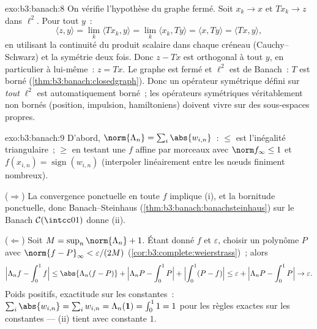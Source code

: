 \begin{solution}{exo:b3:banach:8}
On vérifie l'hypothèse du graphe fermé. Soit $x_k \to x$ et
$Tx_k \to z$ dans $\ell^2$. Pour tout $y$~:
\[
\langle z, y\rangle = \lim_k\langle Tx_k, y\rangle
= \lim_k \langle x_k, Ty\rangle = \langle x, Ty\rangle
= \langle Tx, y\rangle,
\]
en utilisant la continuité du produit scalaire dans chaque
créneau (Cauchy--Schwarz) et la symétrie deux fois. Donc $z -
Tx$ est orthogonal à tout $y$, en particulier à lui-même~: $z
= Tx$. Le graphe est fermé et $\ell^2$ est de Banach~: $T$
est borné (\cref{thm:b3:banach:closedgraph}). Donc un
opérateur symétrique défini sur \emph{tout} $\ell^2$ est
automatiquement borné~; les opérateurs symétriques
véritablement non bornés (position, impulsion, hamiltoniens)
doivent vivre sur des sous-espaces  propres.
\end{solution}

\begin{solution}{exo:b3:banach:9}
D'abord, $\norm{\Lambda_n} = \sum_i\abs{w_{i,n}}$~: $\leq$ est
l'inégalité triangulaire~; $\geq$ en testant une $f$ affine
par morceaux avec $\norm f_\infty \leq 1$ et $f(x_{i,n}) =
\operatorname{sign}(w_{i,n})$ (interpoler linéairement entre
les nœuds finiment nombreux).

($\Rightarrow$) La convergence ponctuelle en toute $f$
implique (i), et la bornitude ponctuelle, donc
Banach--Steinhaus (\cref{thm:b3:banach:banachsteinhaus}) sur
le Banach $\mathcal C(\intcc01)$ donne (ii).

($\Leftarrow$) Soit $M = \sup_n\norm{\Lambda_n} + 1$. Étant
donné $f$ et $\varepsilon$, choisir un polynôme $P$ avec
$\norm{f - P}_\infty < \varepsilon/(2M)$
(\cref{cor:b3:complete:weierstrass})~; alors
\[
\Bigl|\Lambda_n f - \int_0^1 f\Bigr|
\leq \abs{\Lambda_n(f - P)} + \Bigl|\Lambda_nP -
\int_0^1P\Bigr| + \Bigl|\int_0^1(P - f)\Bigr|
\leq \varepsilon + \Bigl|\Lambda_nP - \int_0^1P\Bigr| \to
\varepsilon .
\]
Poids positifs, exactitude sur les constantes~:
$\sum_i\abs{w_{i,n}} = \sum_iw_{i,n} = \Lambda_n(\mathbf 1)
= \int_0^1 1 = 1$ pour les règles exactes sur les constantes
--- (ii) tient avec constante $1$.
\end{solution}

